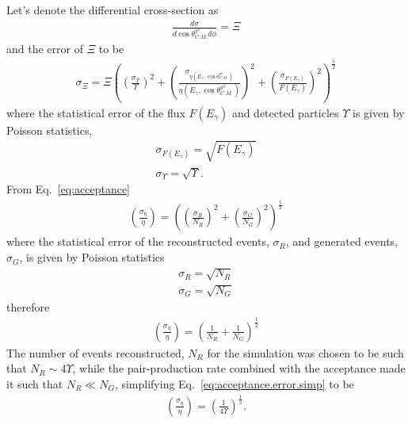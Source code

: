 Let's denote the differential cross-section as 
\begin{align}
\frac{d\sigma}{d\cos\theta^{\pi^0}_{C.M.} d\phi} = \varXi \nonumber
\end{align}
and the error of $\varXi$ to be
\begin{align}
\sigma_\varXi = \varXi \left(\left(\frac{\sigma_{\Upsilon}}{\Upsilon}\right)^2 +\left(\frac{\sigma_{ \eta(E_\gamma,\cos\theta^{\pi^0}_{C.M.})}}{\eta(E_\gamma,\cos\theta^{\pi^0}_{C.M.})}\right)^2 + \left(\frac{\sigma_{F(E_\gamma)}}{F(E_\gamma)}\right)^2\right)^{\frac{1}{2}}\label{eq:xsection.error}
\end{align}
where the statistical error of the flux $F(E_\gamma)$ and detected particles $\Upsilon$ is given by Poisson statistics,
\begin{subequations}
\begin{align}
\sigma_{F(E_\gamma)} = \sqrt{F(E_\gamma)} \label{eq:flux.err} \\
\sigma_{\Upsilon} = \sqrt{\Upsilon} \label{eq:yield.err}. 
\end{align}
\end{subequations}
From Eq.~\ref{eq:acceptance}
\begin{align}\label{eq:acceptance.error}
\left(\frac{\sigma_\eta}{\eta}\right) = \left(\left(\frac{\sigma_R}{N_R}\right)^2 +\left(\frac{\sigma_G}{N_G}\right)^2\right)^{\frac{1}{2}}
\end{align}
where the statistical error of the reconstructed events, $\sigma_R$, and generated events, $\sigma_G$, is given by Poisson statistics
\begin{subequations}
\begin{align}
\sigma_{R} = \sqrt{N_R} \nonumber\\
\sigma_{G} = \sqrt{N_G} \nonumber
\end{align}
\end{subequations}
therefore 
\begin{align}\label{eq:acceptance.error.simp}
\left(\frac{\sigma_\eta}{\eta}\right) = \left(\frac{1}{N_R} +\frac{1}{N_G}\right)^{\frac{1}{2}}
\end{align}
The number of events reconstructed, $N_R$ for the simulation was chosen to be such that $N_R \sim 4\Upsilon$, while the pair-production rate combined with the acceptance made it such that $N_R \ll N_G$, simplifying Eq.~\ref{eq:acceptance.error.simp} to be
\begin{align}\label{eq:acceptance.error.simpII}
\left(\frac{\sigma_\eta}{\eta}\right) = \left(\frac{1}{4\Upsilon}\right)^{\frac{1}{2}}.
\end{align}
